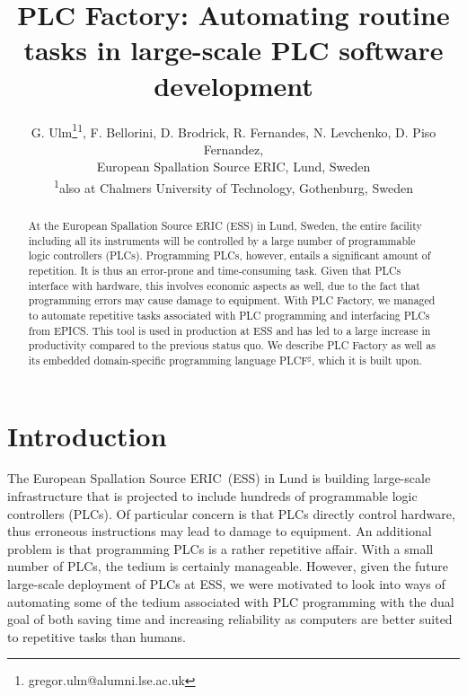 \documentclass[a4paper,
              ]{jacow}
\begin{document}
\title{ PLC Factory: Automating routine tasks in large-scale PLC software development}

\author{G. Ulm\thanks{gregor.ulm@alumni.lse.ac.uk}\textsuperscript{1}, F. Bellorini, D. Brodrick, R. Fernandes, N. Levchenko, D. Piso Fernandez,\\ European Spallation Source ERIC, Lund, Sweden\\
		\textsuperscript{1}also at Chalmers University of Technology, Gothenburg, Sweden
		}
	
\maketitle



\begin{abstract}
At the European Spallation Source ERIC (ESS) in Lund, Sweden, the entire facility including all its instruments will be controlled by a large number of programmable logic controllers (PLCs). Programming PLCs, however, entails a significant amount of repetition. It is thus an error-prone and time-consuming task. Given that PLCs interface with hardware, this involves economic aspects as well, due to the fact that programming errors may cause damage to equipment. With PLC Factory, we managed to automate repetitive tasks associated with PLC programming and interfacing PLCs from EPICS. This tool is used in production at ESS and has led to a large increase in productivity compared to the previous status quo. We describe PLC Factory as well as its embedded domain-specific programming language PLCF$^\sharp$, which it is built upon.
\end{abstract}



\section{Introduction}
The European Spallation Source ERIC~(ESS) in Lund is building large-scale infrastructure that is projected to include hundreds of programmable logic controllers (PLCs). Of particular concern is that PLCs directly control hardware, thus erroneous instructions may lead to damage to equipment. An additional problem is that programming PLCs is a rather repetitive affair. With a small number of PLCs, the tedium is certainly manageable. However, given the future large-scale deployment of PLCs at ESS, we were motivated to look into ways of automating some of the tedium associated with PLC programming with the dual goal of both saving time and increasing reliability as computers are better suited to repetitive tasks than humans.
\end{document}
